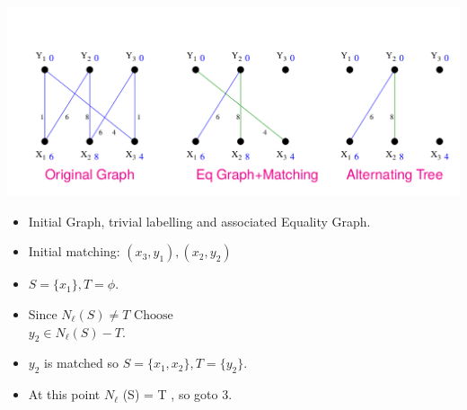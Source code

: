 \documentclass[11pt]{beamer}
\theoremstyle{definition}
\begin{document}
\begin{frame}
\includegraphics[scale=0.3]{hstep1}\cite{hungarian}
\begin{multicols}{2}
\begin{itemize}
\item Initial Graph, trivial labelling and associated Equality Graph.
\item Initial matching: $(x_3,y_1 ),(x_2,y_2)$
\item $S = \{x_1 \}, T = \phi $.
\columnbreak
\item Since $N_\ell (S) \neq T
\mbox{ Choose }$\\$ y_2 \in N_\ell (S)-T$.
\item $y_2$ is matched so 
$S = \{x_1 , x_2 \}, T = \{y_2 \}$.
\item At this point $N_\ell$ (S) = T , so goto 3.
\end{itemize}
\end{multicols}
\end{frame}
\end{document}
